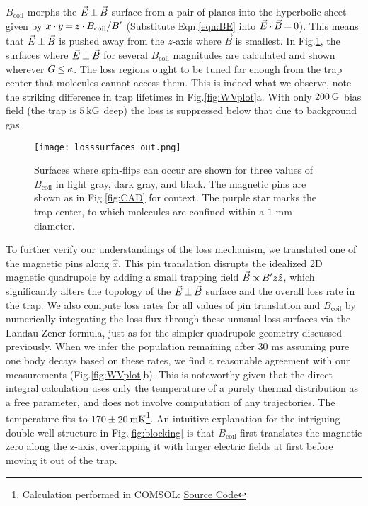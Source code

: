 \documentclass[%
 reprint,
 amsmath,amssymb,
 aps,
prl,
]{revtex4-1}
\newcommand{\bcl}{{$B_\text{coil}$}}
\newcommand{\epb}{{$\vec{E}\s {\perp}\s\vec{B}$}}
\newcommand{\s}{{\nobreak\hspace{.2em}}}
\begin{document}
\bcl{} morphs the \epb{} surface from a pair of planes into the hyperbolic sheet given by
$x\s {\cdot}\s y\s {=}\s  z\s {\cdot}\s B_\text{coil}/B'$
(Substitute Eqn.\s\ref{eqn:BE} into  $\vec{E}\s {\cdot}\s\vec{B}\s {=}\s 0$).
This means that \epb{} is pushed away from the $z$-axis where $\vec{B}$ is smallest.
In Fig.\s\ref{fig:LSurfs}, the surfaces where \epb{} for several \bcl{} magnitudes are calculated and shown wherever $G\s {\le}\s\kappa$.
The loss regions ought to be tuned far enough from the trap center that molecules cannot access them.
This is indeed what we observe, note the striking difference in trap lifetimes in Fig.\s\ref{fig:WVplot}a.
With only $200\s\text{G}$ bias field (the trap is $5\s\text{kG}$ deep) the loss is suppressed below that due to background gas.


\begin{figure}[tb]
\texttt{[image: losssurfaces\_out.png]}%
\caption{
Surfaces where spin-flips can occur are shown for three values of \bcl{} in light gray, dark gray, and black.
The magnetic pins are shown as in Fig.\s\ref{fig:CAD} for context.
The purple star marks the trap center, to which molecules are confined within a \protect\raisebox{2.5px}{\texttildelow} $\!\!1\text{ mm}$ diameter.
\label{fig:LSurfs}}
\end{figure}

To further verify our understandings of the loss mechanism, we translated one of the magnetic pins along $\hat{x}$.
This pin translation disrupts the idealized 2D magnetic quadrupole by adding a small trapping field $\vec{B} \s {\propto}\s  B^\prime z\hat{z}$, which significantly alters the topology of the \epb{} surface and the overall loss rate in the trap.
We also compute loss rates for all values of pin translation and \bcl{} by numerically integrating the loss flux through these unusual loss surfaces via the Landau-Zener formula, just as for the simpler quadrupole geometry discussed previously.
When we infer the population remaining after $30\text{ ms}$ assuming pure one body decays based on these rates, we find a reasonable agreement with our measurements (Fig.\s\ref{fig:WVplot}b).
This is noteworthy given that the direct integral calculation uses only the temperature of a purely thermal distribution as a free parameter, and does not involve computation of any trajectories.
The temperature fits to $170\s {\pm}\s 20\s\text{mK}$\s\footnote{Calculation performed in COMSOL: \href{https://github.com/dreens/spin-flip-integration/}{Source Code}}.
An intuitive explanation for the intriguing double well structure in Fig.\s\ref{fig:blocking} is that \bcl{} first translates the magnetic zero along the z-axis, overlapping it with larger electric fields at first before moving it out of the trap.
\end{document}
